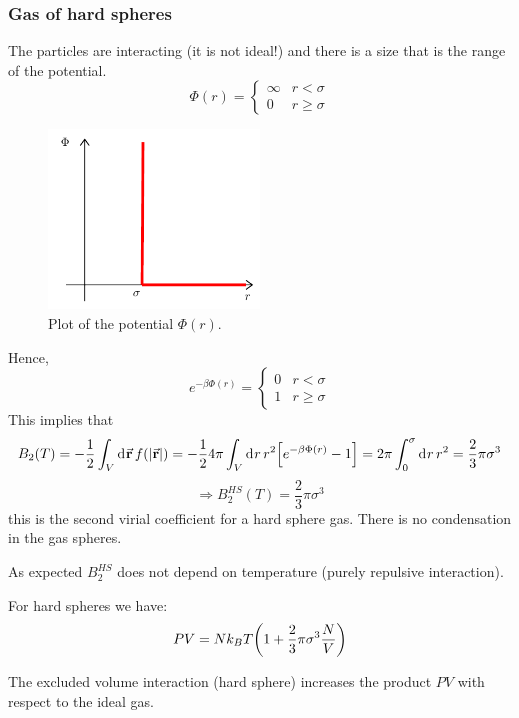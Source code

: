 \documentclass[../main/main.tex]{subfiles}
\begin{document}
\subsubsection{Gas of hard spheres}
The particles are interacting (it is not ideal!) and there is a size that is the range of the potential.
\begin{equation}
  \Phi (r) = \begin{cases}
    \infty & r < \sigma \\
    0     & r \ge \sigma
\end{cases}
\end{equation}
\begin{figure}[h!]
\centering
\includegraphics[width=0.5\textwidth]{../lessons/15_image/1.pdf}
\caption{\label{fig:} Plot of the potential \( \Phi (r) \).}
\end{figure}
Hence,
\begin{equation}
  e^{-\beta \Phi (r)} = \begin{cases}
    0 & r < \sigma\\
    1 & r \ge \sigma
  \end{cases}
\end{equation}
This implies that
\begin{equation}
  B_2 (T)= - \frac{1}{2} \int_{V}^{} \dd[]{\va{r}}  f \qty(\abs{\va{r}} )
  = - \frac{1}{2} 4 \pi \int_{V}^{} \dd[]{r} r^2 \qty[e^{-\beta \Phi (r)}-1 ]
  = 2 \pi \int_{0}^{\sigma } \dd[]{r} r^2 = \frac{2}{3} \pi  \sigma ^3
\end{equation}
\begin{equation}
  \Rightarrow B_2^{HS} (T) = \frac{2}{3} \pi  \sigma ^3
\end{equation}
this is the second virial coefficient for a hard sphere gas. There is no condensation in the gas spheres.
\begin{remark}
As expected \(  B_2^{HS} \) does not depend on temperature (purely repulsive interaction).
\end{remark}
For hard spheres we have:
\begin{equation}
  P V = N k_B T \qty(1 + \frac{2}{3} \pi \sigma ^3 \frac{N}{V})
\end{equation}
\begin{remark}
The excluded volume interaction (hard sphere) increases the product \( PV \) with respect to the ideal gas.
\end{remark}
\end{document}
